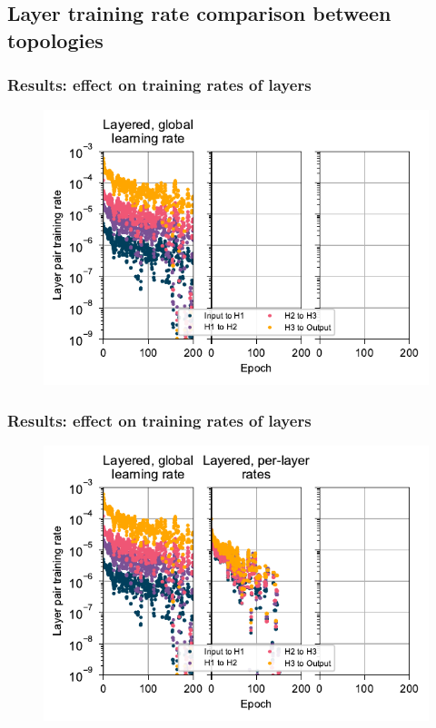\documentclass[pdf]{beamer}
\begin{document}
\subsection{Layer training rate comparison between topologies}
\begin{frame}
	\frametitle{Results: effect on training rates of layers}
	\begin{figure}
		\includegraphics[width=\textwidth]{figures/perlayer_global.pdf}
	\end{figure}
\end{frame}
\begin{frame}
	\frametitle{Results: effect on training rates of layers}
	\begin{figure}
		\includegraphics[width=\textwidth]{figures/perlayer_global+original.pdf}
	\end{figure}
\end{frame}
\end{document}
